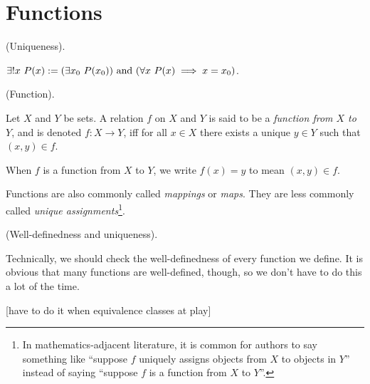 \section*{Functions}

\begin{defn}
    (Uniqueness).
    
    $\exists !x \text{ } P(x) := (\exists x_0 \text{ } P(x_0)) \text{ and } (\forall x \text{ } P(x) \implies x = x_0)$.
\end{defn}

\begin{defn}
    (Function).

    Let $X$ and $Y$ be sets. A relation $f$ on $X$ and $Y$ is said to be a \textit{function from $X$ to $Y$}, and is denoted $f:X \rightarrow Y$, iff for all $x \in X$ there exists a unique $y \in Y$ such that $(x, y) \in f$.

    When $f$ is a function from $X$ to $Y$, we write $f(x) = y$ to mean $(x, y) \in f$.
    
    Functions are also commonly called \textit{mappings} or \textit{maps}. They are less commonly called \textit{unique assignments}\footnote{In mathematics-adjacent literature, it is common for authors to say something like ``suppose $f$ uniquely assigns objects from $X$ to objects in $Y$'' instead of saying ``suppose $f$ is a function from $X$ to $Y$''.}.
\end{defn}

\begin{remark}
    (Well-definedness and uniqueness).
    
    Technically, we should check the well-definedness of every function we define. It is obvious that many functions are well-defined, though, so we don't have to do this a lot of the time.

    [have to do it when equivalence classes at play]
\end{remark}

